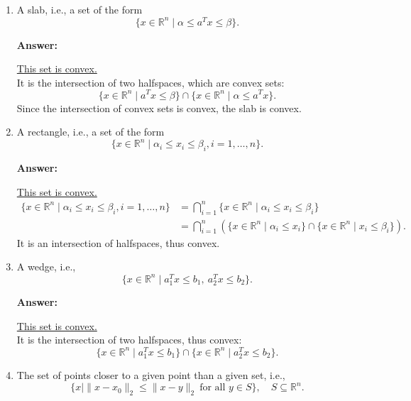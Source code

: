 \documentclass[11pt,a4paper]{article}
\newenvironment{solution}{
  \par\noindent\textbf{Answer:}\vspace{0.3em}
}{\vspace{1em}}
\begin{document}
\begin{enumerate}
\item A slab, i.e., a set of the form
\[
\{ x \in \mathbb{R}^n \mid \alpha \leq a^T x \leq \beta \}.
\]

\begin{solution}
\underline{This set is convex.}\\
It is the intersection of two halfspaces, which are convex sets:
\[
\{ x \in \mathbb{R}^n \mid a^T x \leq \beta \} \cap 
\{ x \in \mathbb{R}^n \mid \alpha \leq a^T x \}.
\]
Since the intersection of convex sets is convex, the slab is convex.
\end{solution}



\item A rectangle, i.e., a set of the form
\[
    \{ x \in \mathbb{R}^n \mid \alpha_i \leq x_i \leq \beta_i, i = 1, \dots, n \}.
\]

\begin{solution}
    \underline{This set is convex.}\\
    \begin{align*}
        \{ x \in \mathbb{R}^n \mid \alpha_i \leq x_i \leq \beta_i, i = 1, \dots, n \}
        &= \bigcap_{i=1}^{n} \{ x \in \mathbb{R}^n \mid \alpha_i \leq x_i \leq \beta_i \} \\
        &= \bigcap_{i=1}^{n} \left( \{ x \in \mathbb{R}^n \mid \alpha_i \leq x_i \} 
        \cap \{ x \in \mathbb{R}^n \mid x_i \leq \beta_i \} \right).
    \end{align*}
    It is an intersection of halfspaces, thus convex.
\end{solution}



\item A wedge, i.e.,
\[
    \{ x \in \mathbb{R}^n \mid a_1^T x \leq b_1,\ a_2^T x \leq b_2 \}.
\]

\begin{solution}
    \underline{This set is convex.}\\
    It is the intersection of two halfspaces, thus convex:
        \[
            \{x \in \mathbb{R}^n \mid a_1^T x \leq b_1\} \cap 
            \{x \in \mathbb{R}^n \mid a_2^T x \leq b_2\}.
        \]
\end{solution}



\item The set of points closer to a given point than a given set, i.e.,
\[
    \{ x \mid \|x - x_0\|_2 \leq \|x - y\|_2 \ \text{for all } y\in S \}, \quad S \subseteq \mathbb{R}^n.
\]


\end{enumerate}
\end{document}
